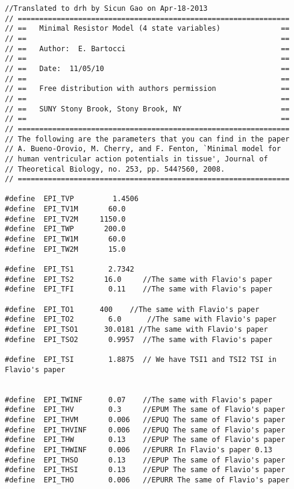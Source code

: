 \begin{verbatim}
//Translated to drh by Sicun Gao on Apr-18-2013
// ===============================================================
// ==   Minimal Resistor Model (4 state variables)              ==
// ==                                                           ==
// ==   Author:  E. Bartocci                                    ==
// ==                                                           ==
// ==   Date:  11/05/10                                         ==
// ==                                                           ==
// ==   Free distribution with authors permission               ==
// ==                                                           ==
// ==   SUNY Stony Brook, Stony Brook, NY                       ==
// ==                                                           ==
// ===============================================================
// The following are the parameters that you can find in the paper
// A. Bueno-Orovio, M. Cherry, and F. Fenton, `Minimal model for
// human ventricular action potentials in tissue', Journal of
// Theoretical Biology, no. 253, pp. 544?560, 2008.
// ===============================================================

#define  EPI_TVP         1.4506
#define  EPI_TV1M       60.0
#define  EPI_TV2M     1150.0
#define  EPI_TWP       200.0
#define  EPI_TW1M       60.0
#define  EPI_TW2M       15.0

#define  EPI_TS1        2.7342
#define  EPI_TS2       16.0     //The same with Flavio's paper
#define  EPI_TFI        0.11    //The same with Flavio's paper

#define  EPI_TO1      400    //The same with Flavio's paper
#define  EPI_TO2        6.0      //The same with Flavio's paper
#define  EPI_TSO1      30.0181 //The same with Flavio's paper
#define  EPI_TSO2       0.9957  //The same with Flavio's paper

#define  EPI_TSI        1.8875  // We have TSI1 and TSI2 TSI in Flavio's paper


#define  EPI_TWINF      0.07    //The same with Flavio's paper
#define  EPI_THV        0.3     //EPUM The same of Flavio's paper
#define  EPI_THVM       0.006   //EPUQ The same of Flavio's paper
#define  EPI_THVINF     0.006   //EPUQ The same of Flavio's paper
#define  EPI_THW        0.13    //EPUP The same of Flavio's paper
#define  EPI_THWINF     0.006   //EPURR In Flavio's paper 0.13
#define  EPI_THSO       0.13    //EPUP The same of Flavio's paper
#define  EPI_THSI       0.13    //EPUP The same of Flavio's paper
#define  EPI_THO        0.006   //EPURR The same of Flavio's paper


\end{verbatim}
